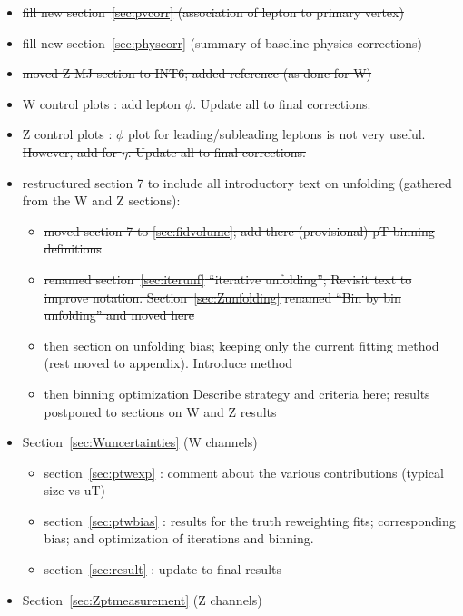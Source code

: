 \begin{itemize}
\item {\sout{\color{red} fill new section~\ref{sec:pvcorr} (association of lepton to primary vertex)}}
\item {\color{red} fill new section~\ref{sec:physcorr} (summary of baseline physics corrections)}
\item {\sout{ moved Z MJ section to INT6; added reference (as done for W) }}
\item {\color{red} W control plots : add lepton $\phi$. Update all to final corrections.}
\item {\sout {\color{red} Z control plots : $\phi$ plot for leading/subleading leptons is not very useful. However, add for $\eta$. Update all to final corrections. }}
\item restructured section 7 to include all introductory text on unfolding (gathered from the W and Z sections):
    \begin{itemize}
    \item \sout{ moved section 7 to \ref{sec:fidvolume}; {\color{red} add there (provisional) pT binning definitions}}
    \item  \sout{ renamed section~\ref{sec:iterunf} ``iterative unfolding''; {\color{red} Revisit text to improve notation}. Section~\ref{sec:Zunfolding} renamed ``Bin by bin unfolding'' and moved here}
    \item then section on unfolding bias; keeping only the current fitting method (rest moved to appendix). \sout{\color{red} Introduce method}
    \item then binning optimization {\color{red} Describe strategy and criteria here; results postponed to sections on W and Z results}
    \end{itemize}
\item Section~\ref{sec:Wuncertainties} (W channels)
    \begin{itemize}
    \item {\color{red} section~\ref{sec:ptwexp} : comment about the various contributions (typical size vs uT)}
    \item {\color{red} section~\ref{sec:ptwbias} : results for the truth reweighting fits; corresponding bias; and optimization of iterations and binning.}
    \item {\color{red} section~\ref{sec:result} : update to final results}
    \end{itemize}
\item Section~\ref{sec:Zptmeasurement} (Z channels)
    \begin{itemize}

\end{itemize}
\end{itemize}
